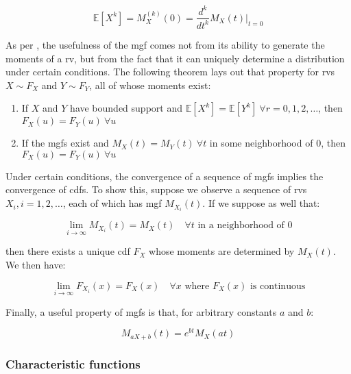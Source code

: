 \documentclass{report}
\begin{document}
\begin{equation}\label{eq:mgf-2}
    \mathbb{E}\left[X^k\right] = M_X^{(k)}(0) = \frac{d^k}{dt^k} M_X(t) \bigg |_{t=0}
\end{equation}

As per \cite[Chapter~2.3]{casella_statistical_2002}, the usefulness of the \gls{mgf} comes not from its ability to generate the moments of a \gls{rv}, but from the fact that it can uniquely determine a distribution under certain conditions. The following theorem lays out that property for \glspl{rv} $X \sim F_X$ and $Y \sim F_Y$, all of whose moments exist:

\begin{enumerate}
    \item If $X$ and $Y$ have bounded support and $\mathbb{E}[X^k] = \mathbb{E}[Y^k] \: \forall r = 0, 1, 2, \dots$, then $F_X(u) = F_Y(u) \: \forall u$
    \item If the \glspl{mgf} exist and $M_X(t) = M_Y(t) \: \forall t$ in some neighborhood of 0, then $F_X(u) = F_Y(u) \: \forall u$
\end{enumerate}

Under certain conditions, the convergence of a sequence of \glspl{mgf} implies the convergence of \glspl{cdf}. To show this, suppose we observe a sequence of \glspl{rv} $X_i, i = 1, 2, \dots$, each of which has \gls{mgf} $M_{X_i}(t)$. If we suppose as well that:

\begin{equation}\label{eq:mgf-convergence-1}
    \lim_{i \to \infty} M_{X_i}(t) = M_X(t) \quad \forall t \text{ in a neighborhood of } 0
\end{equation}

then there exists a unique \gls{cdf} $F_X$ whose moments are determined by $M_X(t)$. We then have:

\begin{equation}\label{eq:mgf-convergence-2}
    \lim_{i\to\infty} F_{X_i}(x) = F_X(x) \quad \forall x \text{ where } F_X(x) \text{ is continuous}
\end{equation}

Finally, a useful property of \glspl{mgf} is that, for arbitrary constants $a$ and $b$:

\begin{equation}\label{eq:mgf-of-combination}
    M_{aX + b}(t) = e^{bt}M_X(at)
\end{equation}

\subsubsection{Characteristic functions}
\end{document}
